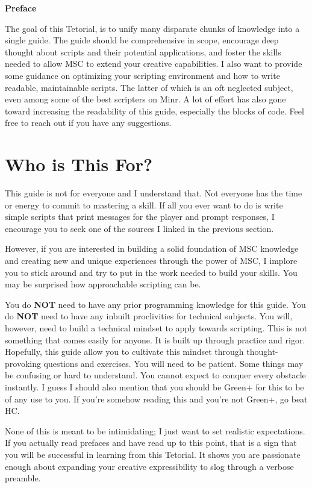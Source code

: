 \documentclass[oneside]{book}
\newcommand{\prefacename}{Preface}
\newenvironment{preface}{
    \vspace*{\stretch{2}}
    {\noindent \bfseries \Huge \prefacename}
    \begin{center}
        \phantomsection \addcontentsline{toc}{chapter}{\prefacename} %
        \thispagestyle{plain}
    \end{center}%
}
{\vspace*{\stretch{5}}}
\begin{document}
\begin{preface}
The goal of this Tetorial, is to unify many disparate chunks of knowledge into a single guide. The guide should be comprehensive in scope, encourage deep thought about scripts and their potential applications, and foster the skills needed to allow MSC to extend your creative capabilities. I also want to provide some guidance on optimizing your scripting environment and how to write readable, maintainable scripts. The latter of which is an oft neglected subject, even among some of the best scripters on Minr. A lot of effort has also gone toward increasing the readability of this guide, especially the blocks of code. Feel free to reach out if you have any suggestions.

\section*{Who is This For?}
This guide is not for everyone and I understand that. Not everyone has the time or energy to commit to mastering a skill. If all you ever want to do is write simple scripts that print messages for the player and prompt responses, I encourage you to seek one of the sources I linked in the previous section.

However, if you are interested in building a solid foundation of MSC knowledge and creating new and unique experiences through the power of MSC, I implore you to stick around and try to put in the work needed to build your skills. You may be surprised how approachable scripting can be.

You do \textbf{NOT} need to have any prior programming knowledge for this guide. You do \textbf{NOT} need to have any inbuilt proclivities for technical subjects. You will, however, need to build a technical mindset to apply towards scripting. This is not something that comes easily for anyone. It is built up through practice and rigor. Hopefully, this guide allow you to cultivate this mindset through thought-provoking questions and exercises. You will need to be patient. Some things may be confusing or hard to understand. You cannot expect to conquer every obstacle instantly. I guess I should also mention that you should be Green+ for this to be of any use to you. If you're somehow reading this and you're not Green+, go beat HC.

None of this is meant to be intimidating; I just want to set realistic expectations. If you actually read prefaces and have read up to this point, that is a sign that you will be successful in learning from this Tetorial. It shows you are passionate enough about expanding your creative expressibility to slog through a verbose preamble.


\end{preface}
\end{document}
